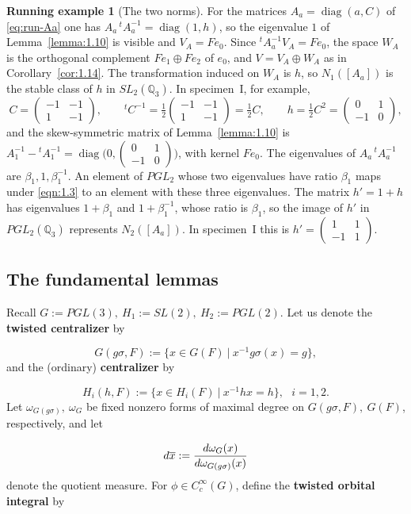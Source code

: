 \documentclass[12pt,letterpaper]{amsart}
\numberwithin{equation}{section}
\theoremstyle{definition}
\newtheorem{runex}[theorem]{Running example}
\theoremstyle{plain}
\newcommand{\smat}[4]{\left(\begin{smallmatrix}#1&#2\\#3&#4\end{smallmatrix}\right)}
\def\ovx{\overline{x}}
\begin{document}
\begin{runex}[The two norms]
\label{run:norm}
For the matrices $A_a=\operatorname{diag}(a,C)$ of
\eqref{eq:run-Aa} one has
$A_a\,{}^tA_a^{-1}=\operatorname{diag}(1,h)$, so the eigenvalue $1$
of Lemma~\ref{lemma:1.10} is visible and $V_A=Fe_0$. Since
${}^tA_a^{-1}V_A=Fe_0$, the space $W_A$ is the orthogonal complement
$Fe_1\oplus Fe_2$ of $e_0$, and $V=V_A\oplus W_A$ as in
Corollary~\ref{cor:1.14}. The transformation induced on $W_A$ is $h$,
so $N_1([A_a])$ is the stable class of $h$ in $SL_2(\mathbb Q_3)$.
In specimen~I, for example,
\[
 C=\smat{-1}{-1}{1}{-1},\qquad
 {}^tC^{-1}=\tfrac12\smat{-1}{-1}{1}{-1}=\tfrac12C,\qquad
 h=\tfrac12C^2=\smat{0}{1}{-1}{0},
\]
and the skew-symmetric matrix of Lemma~\ref{lemma:1.10} is
$A_1^{-1}-{}^tA_1^{-1}=\operatorname{diag}\bigl(0,\smat{0}{1}{-1}{0}\bigr)$,
with kernel $Fe_0$. The eigenvalues of $A_a\,{}^tA_a^{-1}$ are
$\beta_1,1,\beta_1^{-1}$. An element of $PGL_2$ whose two eigenvalues
have ratio $\beta_1$ maps under \eqref{eqn:1.3} to an element with
these three eigenvalues. The matrix $h'=1+h$ has eigenvalues
$1+\beta_1$ and $1+\beta_1^{-1}$, whose ratio is $\beta_1$, so the
image of $h'$ in $PGL_2(\mathbb Q_3)$ represents $N_2([A_a])$. In
specimen~I this is $h'=\smat{1}{1}{-1}{1}$.
\end{runex}

\subsection{The fundamental lemmas}
\label{sec:1.4}

Recall $G := PGL(3),\ H_1 := SL(2),\ H_2 := PGL(2)$. Let us denote the 
{\bf twisted centralizer} by

\begin{equation}
\label{eqn:1.15}
G(g\sigma ,F) := \{x \in G(F)\ |\ x^{-1}g\sigma (x) = g\},
\end{equation}
and the (ordinary) {\bf centralizer} by

\begin{equation}
\label{eqn:1.16}
H_i(h,F) := \{x \in H_i(F) \ |\ x^{-1}hx = h\},\ \ \ i=1,2.
\end{equation}
Let $\omega_{G(g\sigma )},\ \omega_G$ be fixed nonzero forms of maximal
degree on $G(g\sigma ,F),\ G(F)$, respectively, and let

\[
d\ovx := {d\omega_G(x)\over{d\omega_{G(g\sigma )}(x)}}
\]
denote the quotient measure. For $\phi \in C^\infty_c(G)$, define the 
{\bf twisted orbital integral} by
\end{document}
